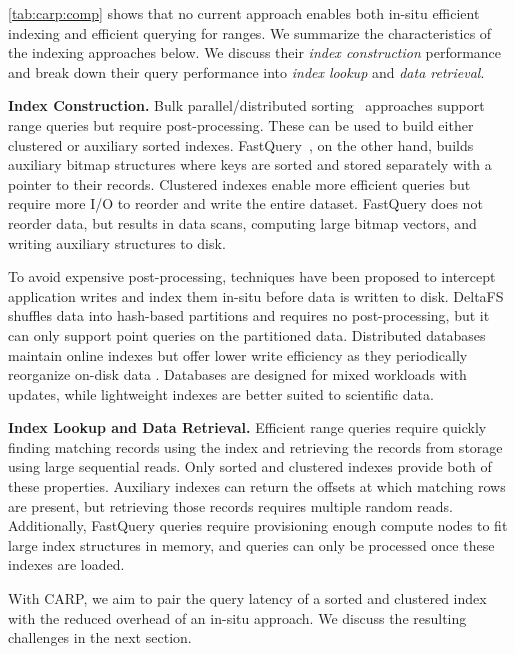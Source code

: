 \cref{tab:carp:comp} shows that no current approach enables both in-situ efficient indexing and
efficient querying for ranges.
We summarize the characteristics of the indexing approaches below.
We discuss their \emph{index construction} performance and break down their query performance into
\emph{index lookup} and \emph{data retrieval}.

\textbf{Index Construction.
}
Bulk parallel/distributed sorting~\cite{Sunda2013:HykSort, Dong2016, Rasmu2011:TritonSort}
approaches support range queries but require post-processing.
These can be used to build either clustered or auxiliary sorted indexes.
FastQuery~\cite{Chou2011:FastQuery}, on the other hand, builds auxiliary bitmap structures where
keys are sorted and stored separately with a pointer to their records.
Clustered indexes enable more efficient queries but require more I/O to reorder and write the
entire dataset.
FastQuery does not reorder data, but results in data scans, computing large bitmap vectors, and
writing auxiliary structures to disk.

To avoid expensive post-processing, techniques have been proposed to intercept application writes
and index them in-situ before data is written to disk.
DeltaFS \cite{Zheng2018:DeltaFS} shuffles data into hash-based partitions and requires no
post-processing, but it can only support point queries on the partitioned data.
Distributed databases maintain online indexes but offer lower write efficiency as they periodically
reorganize on-disk data \cite{Raju2017:PebblesDB}.
Databases are designed for mixed workloads with updates, while lightweight indexes are better
suited to scientific data.

\textbf{Index Lookup and Data Retrieval.
}
Efficient range queries require quickly finding matching records using the index and retrieving the
records from storage using large sequential reads.
Only sorted and clustered indexes provide both of these properties.
Auxiliary indexes can return the offsets at which matching rows are present, but retrieving those
records requires multiple random reads.
Additionally, FastQuery queries require provisioning enough compute nodes to fit large index
structures in memory, and queries can only be processed once these indexes are loaded.

With CARP, we aim to pair the query latency of a sorted and clustered index with the reduced
overhead of an in-situ approach.
We discuss the resulting challenges in the next section.
